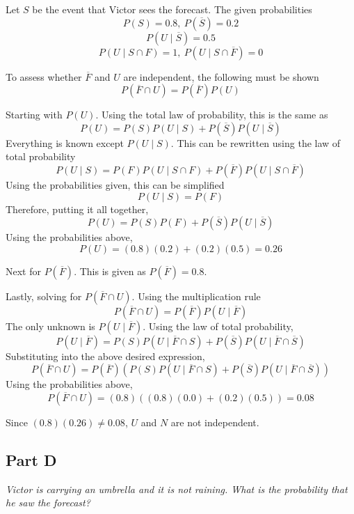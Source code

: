 \documentclass{article}
\begin{document}
\bigbreak

Let $ S $ be the event that Victor sees the forecast. The given probabilities
$$ P(S) = 0.8,\ P(\overline{S}) = 0.2 $$
$$ P(U \mid \overline{S}) = 0.5 $$
$$ P(U \mid S \cap F) = 1,\ P(U \mid S \cap \overline{F}) = 0 $$

To assess whether $ \overline{F} $ and $ U $ are independent, the following must
be shown
$$ P(\overline{F} \cap U) = P(\overline{F}) P(U) $$

Starting with $ P(U) $. Using the total law of probability, this is the same as
$$ P(U) = P(S) P(U \mid S) + P(\overline{S}) P(U \mid \overline{S}) $$
Everything is known except $ P(U \mid S) $. This can be rewritten using the law
of total probability
$$ P(U \mid S) = P(F) P(U \mid S \cap F) + P(\overline{F}) P(U \mid S \cap
\overline{F}) $$
Using the probabilities given, this can be simplified
$$ P(U \mid S) = P(F) $$
Therefore, putting it all together,
$$ P(U) = P(S) P(F) + P(\overline{S}) P(U \mid \overline{S}) $$
Using the probabilities above,
$$ P(U) = (0.8) (0.2) + (0.2) (0.5) = 0.26 $$

Next for $ P(\overline{F}) $. This is given as $ P(\overline{F}) = 0.8 $.

Lastly, solving for $ P(\overline{F} \cap U) $. Using the multiplication rule
$$ P(\overline{F} \cap U) = P(\overline{F}) P(U \mid \overline{F}) $$
The only unknown is $ P(U \mid \overline{F}) $. Using the law of total
probability,
$$ P(U \mid \overline{F}) = P(S) P(U \mid \overline{F} \cap S) + P(\overline{S})
P(U \mid \overline{F} \cap \overline{S}) $$
Substituting into the above desired expression,
$$ P(\overline{F} \cap U) = P(\overline{F}) (P(S) P(U \mid \overline{F} \cap S)
+ P(\overline{S}) P(U \mid \overline{F} \cap \overline{S})) $$
Using the probabilities above,
$$ P(\overline{F} \cap U) = (0.8) ( (0.8) (0.0) + (0.2) (0.5) ) = 0.08 $$

Since $ (0.8) (0.26) \neq 0.08 $, $ U $ and $ N $ are not independent.

\subsection*{Part D}

\textit{Victor is carrying an umbrella and it is not raining. What is the
probability that he saw the forecast?}
\end{document}
